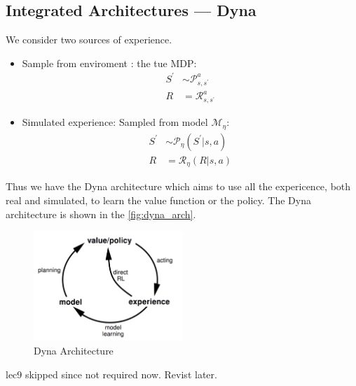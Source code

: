 \subsection{Integrated Architectures --- Dyna}
We consider two sources of experience.
\begin{itemize}
    \item Sample from enviroment : the tue MDP:
    \[
        \begin{aligned}
            S^{\prime} &\sim \mathcal{P}_{s, s^{\prime}}^{a} \\
            R &=\mathcal{R}_{s, s^{\prime}}^{a}
        \end{aligned}
    \]
    \item Simulated experience: Sampled from model \(\mathcal{M} _\eta\):
    \[
        \begin{aligned}
            S^{\prime} &\sim \mathcal{P}_{\eta}(S^{\prime} | s, a) \\
            R &=\mathcal{R}_{\eta}(R | s, a)
        \end{aligned}  
    \]
\end{itemize}
Thus we have the Dyna architecture which aims to use all the expericence, both real and simulated, to 
learn the value function or the policy. The Dyna architecture is shown in the \autoref{fig:dyna_arch}.
\begin{figure}[H]
    \centering
    \includegraphics[width=0.5\textwidth]{figures/dyna.png}
    \caption{Dyna Architecture}
    \label{fig:dyna_arch}
\end{figure}

\begin{note}
    lec9 skipped since not required now. Revist later.  
\end{note}